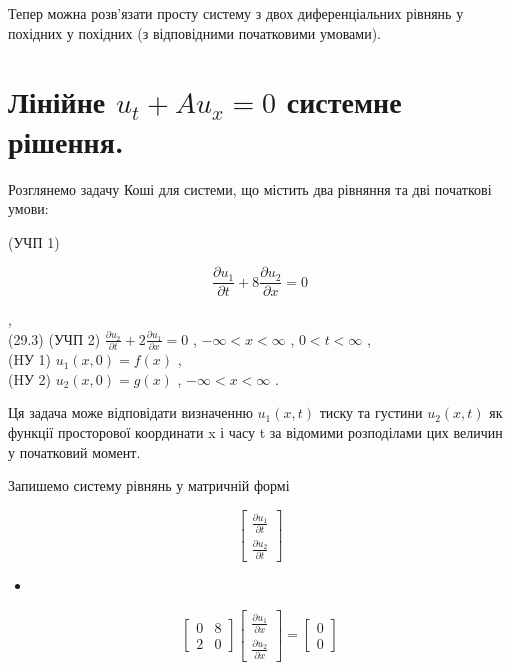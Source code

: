 \documentclass[
  ukrainian,
]{article}
\providecommand{\tightlist}{%
  \setlength{\itemsep}{0pt}\setlength{\parskip}{0pt}}
\begin{document}
Тепер можна розв'язати просту систему з двох диференціальних рівнянь у
похідних у похідних (з відповідними початковими умовами).

\section{\texorpdfstring{Лінійне \(u_t + Au_x = 0\) системне
рішення.}{Лінійне u\_t + Au\_x = 0 системне рішення.}}\label{ux43bux456ux43dux456ux439ux43dux435-u_t-au_x-0-ux441ux438ux441ux442ux435ux43cux43dux435-ux440ux456ux448ux435ux43dux43dux44f.}

Розглянемо задачу Коші для системи, що містить два рівняння та дві
початкові умови:

(УЧП 1)

\[
\frac{\partial u_1}{\partial t} + 8 \frac{\partial u_2}{\partial x} = 0
\]

,\\
(29.3) (УЧП 2)
\(\frac{\partial u_2}{\partial t} + 2 \frac{\partial u_1}{\partial x} = 0\)
, \(-\infty < x < \infty\) , \(0 < t < \infty\) ,\\
(HУ 1) \(u_1(x, 0) = f(x)\) ,\\
(HУ 2) \(u_2(x, 0) = g(x)\) , \(-\infty < x < \infty\) .

Ця задача може відповідати визначенню \(u_1(x, t)\) тиску та густини
\(u_2(x, t)\) як функції просторової координати x і часу t за відомими
розподілами цих величин у початковий момент.

Запишемо систему рівнянь у матричній формі

\[
\begin{bmatrix} \frac{\partial u_1}{\partial t} \\ \frac{\partial u_2}{\partial t} \end{bmatrix}
\]

\begin{itemize}
\tightlist
\item
\end{itemize}

\[
\begin{bmatrix} 0 & 8 \\ 2 & 0 \end{bmatrix}
\begin{bmatrix} \frac{\partial u_1}{\partial x} \\ \frac{\partial u_2}{\partial x} \end{bmatrix}
=
\begin{bmatrix} 0 \\ 0 \end{bmatrix}
\]
\end{document}
